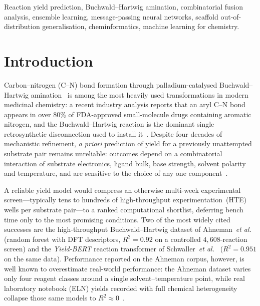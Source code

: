 \documentclass[conference]{IEEEtran}
\begin{document}
\begin{IEEEkeywords}
Reaction yield prediction, Buchwald--Hartwig amination, combinatorial fusion
analysis, ensemble learning, message-passing neural networks, scaffold
out-of-distribution generalisation, cheminformatics, machine learning for
chemistry.
\end{IEEEkeywords}

\section{Introduction}
\label{sec:intro}

Carbon--nitrogen (C--N) bond formation through palladium-catalysed
Buchwald--Hartwig amination~\cite{Wolfe1996,Hartwig1998} is among the most
heavily used transformations in modern medicinal chemistry: a recent industry
analysis reports that an aryl C--N bond appears in over $80\%$ of FDA-approved
small-molecule drugs containing aromatic nitrogen, and the Buchwald--Hartwig
reaction is the dominant single retrosynthetic disconnection used to install
it~\cite{Schneider2016}. Despite four decades of mechanistic refinement,
\emph{a priori} prediction of yield for a previously unattempted substrate
pair remains unreliable: outcomes depend on a combinatorial interaction of
substrate electronics, ligand bulk, base strength, solvent polarity and
temperature, and are sensitive to the choice of any one
component~\cite{Buitrago2018}.

A reliable yield model would compress an otherwise multi-week experimental
screen---typically tens to hundreds of high-throughput experimentation~(HTE)
wells per substrate pair---to a ranked computational shortlist, deferring
bench time only to the most promising conditions. Two of the most widely
cited successes are the high-throughput Buchwald--Hartwig dataset of
Ahneman~\textit{et al.}~\cite{Ahneman2018} (random forest with DFT
descriptors, $R^{2}=0.92$ on a controlled $4{,}608$-reaction screen) and the
\emph{Yield-BERT} reaction transformer of
Schwaller~\textit{et al.}~\cite{Schwaller2021YB} ($R^{2}=0.951$ on the same
data). Performance reported on the Ahneman corpus, however, is well known to
overestimate real-world performance: the Ahneman dataset varies only four
reagent classes around a single solvent--temperature point, while real
laboratory notebook (ELN) yields recorded with full chemical heterogeneity
collapse those same models to $R^{2}\approx 0$~\cite{Fitzner2023,Wigh2024,Saebi2023}.
\end{document}
